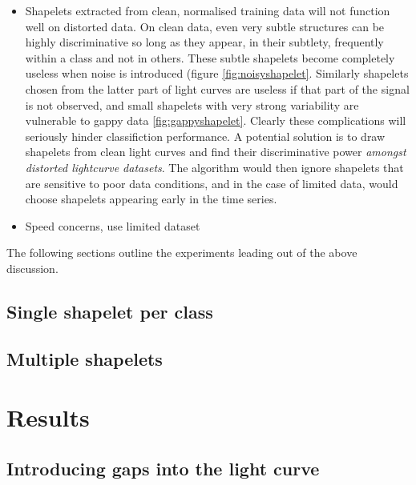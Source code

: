 \begin{itemize}
	\item Shapelets extracted from clean, normalised training data will not function well on distorted data. On clean data, even very subtle structures can be highly discriminative so long as they appear, in their subtlety, frequently within a class and not in others. These subtle shapelets become completely useless when noise is introduced (figure \ref{fig:noisyshapelet}. Similarly shapelets chosen from the latter part of light curves are useless if that part of the signal is not observed, and small shapelets with very strong variability are vulnerable to gappy data \ref{fig:gappyshapelet}. Clearly these complications will seriously hinder classifiction performance. A potential solution is to draw shapelets from clean light curves and find their discriminative power \emph{amongst distorted lightcurve datasets}. The algorithm would then ignore shapelets that are sensitive to poor data conditions, and in the case of limited data, would choose shapelets appearing early in the time series.
	\item Speed concerns, use limited dataset %
\end{itemize}

The following sections outline the experiments leading out of the above discussion.
\setlength{\tabcolsep}{1.4pt}
\setlength{\extrarowheight}{1.8pt}

\subsection{Single shapelet per class}
\subsection{Multiple shapelets}
\clearpage
\section{Results}
\subsection{Introducing gaps into the light curve}
%
\clearpage
